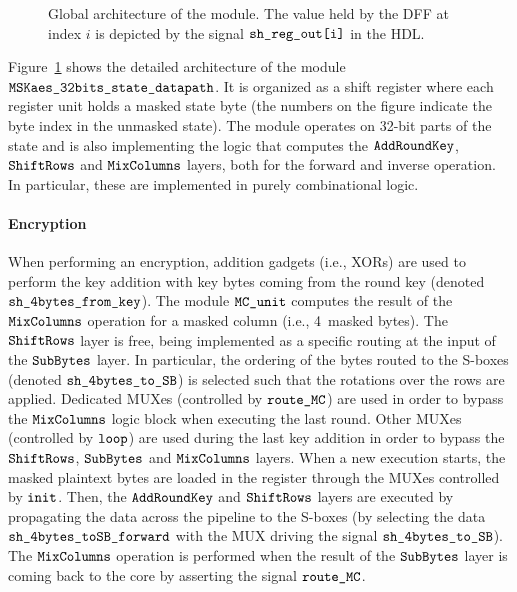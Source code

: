 \documentclass{scrartcl}
\begin{document}
\begin{figure}
    \centering
    \resizebox{\textwidth}{!}{
        \begin{tikzpicture}
            
        \end{tikzpicture}
    }
    \caption{Global architecture of the \modAESdpState module. The value held by the DFF at index $i$ is depicted by the signal $\texttt{sh\_reg\_out[i]}$ in the HDL.}
    \label{fig:aes_dpState}
\end{figure}

Figure~\ref{fig:aes_dpState} shows the detailed architecture of the
module $\texttt{MSKaes\_32bits\_state\_datapath}$. It is organized as a shift register where each
register unit holds a masked state byte (the numbers on the figure
indicate the byte index in the unmasked state).
The module operates on 32-bit parts of the state and is also implementing the
logic that computes the $\texttt{AddRoundKey}$, $\texttt{ShiftRows}$ and $\texttt{MixColumns}$ layers, both for the forward and inverse operation.
In particular, these are implemented in purely combinational logic.   

\paragraph{Encryption} When performing an encryption, addition gadgets (i.e., XORs) are used to
perform the key addition with key bytes coming from the round key (denoted
$\texttt{sh\_4bytes\_from\_key}$). The module $\texttt{MC\_unit}$ computes the result of the
$\texttt{MixColumns}$ operation for a masked column (i.e., 4~masked bytes). The $\texttt{ShiftRows}$ layer is
free, being implemented as a specific routing at the input of the $\texttt{SubBytes}$ layer.
In particular, the ordering of the bytes routed to the S-boxes (denoted
$\texttt{sh\_4bytes\_to\_SB}$) is selected such that the rotations over the rows are
applied. Dedicated MUXes (controlled by $\texttt{route\_MC}$) are used in
order to bypass the $\texttt{MixColumns}$ logic block when executing the last round.  Other
MUXes (controlled by $\texttt{loop}$) are used during the last key
addition in order to bypass the $\texttt{ShiftRows}$, $\texttt{SubBytes}$ and $\texttt{MixColumns}$ layers.  When a new
execution starts, the masked plaintext bytes are loaded in the register through
the MUXes controlled by $\texttt{init}$.  Then, the $\texttt{AddRoundKey}$ and $\texttt{ShiftRows}$
layers are executed by propagating the data across the pipeline to the S-boxes
(by selecting the data $\texttt{sh\_4bytes\_toSB\_forward}$ with the MUX driving the signal
$\texttt{sh\_4bytes\_to\_SB}$).  The $\texttt{MixColumns}$ operation is performed when the result of the
$\texttt{SubBytes}$ layer is coming back to the core by asserting the signal
$\texttt{route\_MC}$. 
\end{document}
